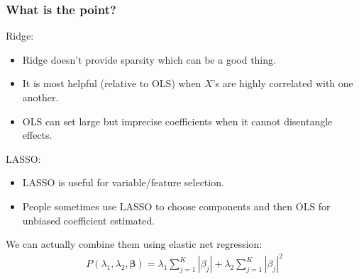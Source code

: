 \begin{frame}
\frametitle{What is the point?}
\vspace{-10pt}
Ridge:
\begin{itemize}
\item Ridge doesn't provide sparsity which can be a good thing.
\item It is most helpful (relative to OLS) when $X$'s are highly correlated with one another.
\item OLS can set large but imprecise coefficients when it cannot disentangle effects.
\end{itemize}
LASSO:
\begin{itemize}
\item LASSO is useful for variable/feature selection.
\item People sometimes use LASSO to choose components and then OLS for unbiased coefficient estimated.
\end{itemize}
We can actually combine them using \alert{elastic net regression}:
\begin{eqnarray*}
 P(\lambda_1,\lambda_2,\mathbf{\beta}) =  \lambda _1\sum_{j=1}^K | \beta_j|  +\lambda_2 \sum_{j=1}^K | \beta_j|^2 
 \end{eqnarray*}
\end{frame}


